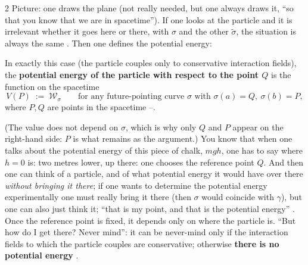 \begin{paracol}{2}
Picture: one draws the plane (not really needed, but one always draws it, ``so that you know that we are in spacetime''). If one looks at the particle and it is irrelevant whether it goes here or there, with $\sigma$ and the other $\tilde\sigma$, the situation is always the same . Then one defines the potential energy:
\begin{definition}\label{def:nd-potential}
In exactly this case (the particle couples only to conservative interaction fields), the \textbf{potential energy of the particle with respect to the point $Q$} is the function on the spacetime
\begin{equation}\label{eq:nd-potential}
  V(P)\;:=\;\mathcal W_\sigma\qquad\text{for any future-pointing curve }\sigma\text{ with }\sigma(a)=Q,\ \sigma(b)=P ,
\end{equation}
where $P,Q$ are points in the spacetime --.
\end{definition}
(The value does not depend on $\sigma$, which is why only $Q$ and $P$ appear on the right-hand side: $P$ is what remains as the argument.) You know that when one talks about the potential energy of this piece of chalk, $mgh$, one has to say where $h=0$ is: two metres lower, up there: one chooses the reference point $Q$. And then one can think of a particle, and of what potential
energy it would have over there \emph{without bringing it there}; if one wants to determine the potential energy experimentally one must really bring it there (then $\sigma$ would coincide with $\gamma$), but one can also just think it; ``that is my point, and that is the potential energy'' . Once the reference point is fixed, it depends only on where the particle is.
``But how do I get there? Never mind'': it can be never-mind only if the interaction fields to which the particle couples are conservative; otherwise \textbf{there is no potential energy} .


\end{paracol}
